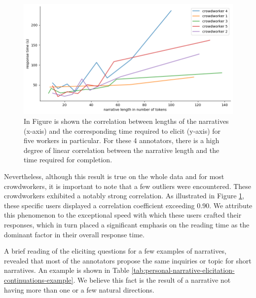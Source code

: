 \begin{figure}[!htbp]
        \includegraphics[width=1\linewidth]{assets//imgs/dataset-high-correlation-workers.png}
        \caption{In Figure is shown the correlation between lengths of the narratives (x-axis) and the corresponding time required to elicit (y-axis) for five workers in particular. For these 4 annotators, there is a high degree of linear correlation between the narrative length and the time required for completion.}
        \label{fig:dataset-high-correlation-workers}
\end{figure}
Nevertheless, although this result is true on the whole data and for most crowdworkers, it is important to note that a few outliers were encountered. These crowdworkers exhibited a notably strong correlation. As illustrated in Figure \ref{fig:dataset-high-correlation-workers}, these specific users displayed a correlation coefficient exceeding 0.90. We attribute this phenomenon to the exceptional speed with which these users crafted their responses, which in turn placed a significant emphasis on the reading time as the dominant factor in their overall response time.


A brief reading of the eliciting questions for a few examples of narratives, revealed that most of the annotators propose the same inquiries or topic for short narratives. An example is shown in Table \ref{tab:personal-narrative-elicitation-continuations-example}. We believe this fact is the result of a narrative not having more than one or a few natural directions.%
